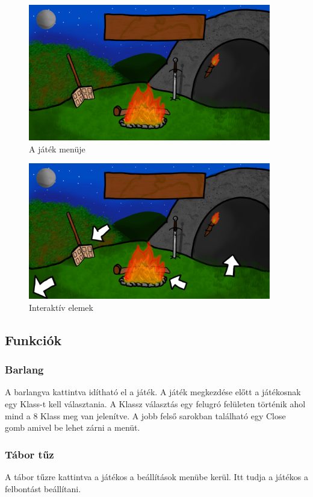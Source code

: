 \begin{figure}[h]
        \centering
        \includegraphics[width=400px,keepaspectratio]{images/Menu.png}
        \caption {A játék menüje}
        \label{Menü}
    \hspace{1em}
\end{figure}
\begin{figure}[h]
        \centering
        \includegraphics[width=400px,keepaspectratio]{images/menü_with_arrows.png}
        \caption {Interaktív elemek}
        \label{Menü_with_arrows}
    \hspace{1em}
\end{figure}
\clearpage
\subsection{Funkciók}
\subsubsection{Barlang}
A barlangva kattintva idítható el a játék. A játék megkezdése előtt a játékosnak egy Klass-t kell választania. A Klassz választás egy felugró felületen történik ahol mind a 8 Klass meg van jelenítve. A jobb felső sarokban található egy Close gomb amivel be lehet zárni a menüt.
\subsubsection{Tábor tűz}
A tábor tűzre kattintva a játékos a beállítások menübe kerül. Itt tudja a játékos a felbontást beállítani.

